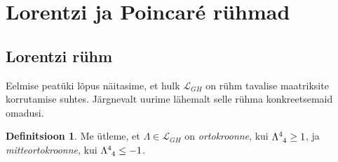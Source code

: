 \documentclass[12pt,a4paper,oneside]{article}
\theoremstyle{plain}
\theoremstyle{definition}
\newtheorem{definitsioon}{Definitsioon}[section]
\numberwithin{equation}{section}
\def\L{{\mathcal L}}
\begin{document}
\newpage
\section{Lorentzi ja Poincar\'e rühmad}

\subsection{Lorentzi rühm}

Eelmise peatüki lõpus näitasime, et hulk $\L_{GH}$ on rühm 
tavalise maatriksite korrutamise suhtes. Järgnevalt uurime 
lähemalt selle rühma konkreetsemaid omadusi.

\begin{definitsioon}
Me ütleme, et $\Lambda \in \L_{GH}$ on \emph{ortokroonne}, kui 
$\Lambda\indices{^4_4} \geq 1$, ja \emph{mitteortokroonne}, kui 
$\Lambda\indices{^4_4} \leq -1$.
\end{definitsioon}
\end{document}

